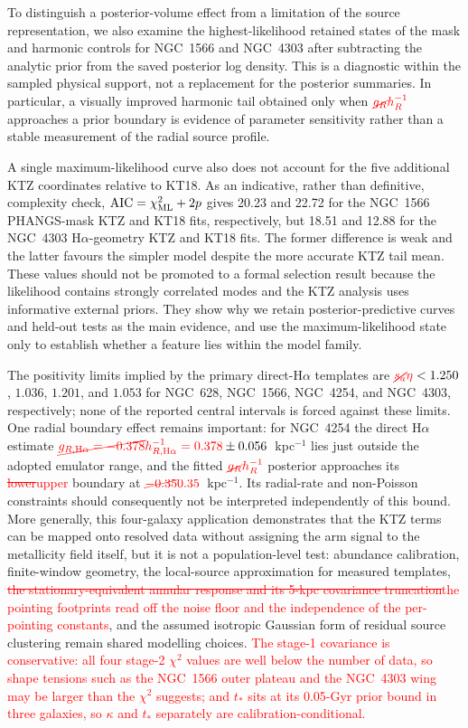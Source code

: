 \documentclass[fleqn,usenatbib]{mnras}
\newcommand{\revadd}[1]{\textcolor{red}{#1}}
\newcommand{\revdel}[1]{\textcolor{red}{\sout{#1}}\hspace{0.18em}}
\newcommand{\revaddmath}[1]{\textcolor{red}{#1}}
\newcommand{\revdelmath}[1]{\textcolor{red}{\cancel{#1}}}
\begin{document}
To distinguish a posterior-volume effect from a limitation of the source representation, we also examine the highest-likelihood retained states of the mask and harmonic controls for NGC~1566 and NGC~4303 after subtracting the analytic prior from the saved posterior log density.  This is a diagnostic within the sampled physical support, not a replacement for the posterior summaries.  In particular, a visually improved harmonic tail obtained only when $\revdelmath{g_R}\revaddmath{h_R^{-1}}$ approaches a prior boundary is evidence of parameter sensitivity rather than a stable measurement of the radial source profile.

A single maximum-likelihood curve also does not account for the five additional KTZ coordinates relative to KT18.  As an indicative, rather than definitive, complexity check, $\mathrm{AIC}=\chi^2_{\rm ML}+2p$ gives 20.23 and 22.72 for the NGC~1566 PHANGS-mask KTZ and KT18 fits, respectively, but 18.51 and 12.88 for the NGC~4303 H$\alpha$-geometry KTZ and KT18 fits.  The former difference is weak and the latter favours the simpler model despite the more accurate KTZ tail mean.  These values should not be promoted to a formal selection result because the likelihood contains strongly correlated modes and the KTZ analysis uses informative external priors.  They show why we retain posterior-predictive curves and held-out tests as the main evidence, and use the maximum-likelihood state only to establish whether a feature lies within the model family.

The positivity limits implied by the primary direct-H$\alpha$ templates are $\revdelmath{s_a}\revaddmath{\eta}<1.250$, $1.036$, $1.201$, and $1.053$ for NGC~628, NGC~1566, NGC~4254, and NGC~4303, respectively; none of the reported central intervals is forced against these limits.  One radial boundary effect remains important: for NGC~4254 the direct H$\alpha$ estimate $\revdelmath{g_{R,\mathrm{H}\alpha}=-0.378}\revaddmath{h_{R,{\rm H}\alpha}^{-1}=0.378}\pm0.056$~kpc$^{-1}$ lies just outside the adopted emulator range, and the fitted $\revdelmath{g_R}\revaddmath{h_R^{-1}}$ posterior approaches its \revdel{lower}\revadd{upper} boundary at $\revdelmath{-0.35}\revaddmath{0.35}$~kpc$^{-1}$.  Its radial-rate and non-Poisson constraints should consequently not be interpreted independently of this bound.  More generally, this four-galaxy application demonstrates that the KTZ terms can be mapped onto resolved data without assigning the arm signal to the metallicity field itself, but it is not a population-level test: abundance calibration, finite-window geometry, the local-source approximation for measured templates, \revdel{the stationary-equivalent annular response and its 5-kpc covariance truncation}\revadd{the pointing footprints read off the noise floor and the independence of the per-pointing constants}, and the assumed isotropic Gaussian form of residual source clustering remain shared modelling choices.\revadd{  The stage-1 covariance is conservative: all four stage-2 $\chi^2$ values are well below the number of data, so shape tensions such as the NGC~1566 outer plateau and the NGC~4303 wing may be larger than the $\chi^2$ suggests; and $t_\ast$ sits at its 0.05-Gyr prior bound in three galaxies, so $\kappa$ and $t_\ast$ separately are calibration-conditional.}
\end{document}
